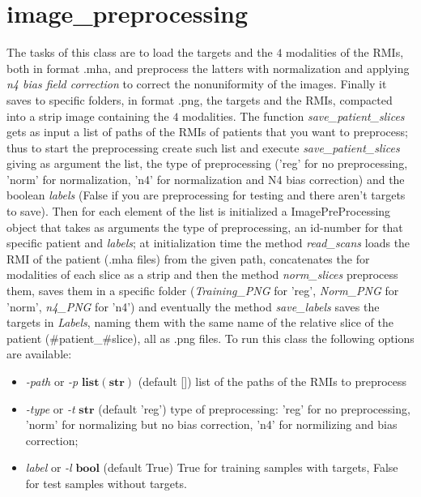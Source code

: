 \documentclass[openany,12pt,english]{book}
\begin{document}
	\section{image\_preprocessing}
	The tasks of this class are to load the targets and the $4$ modalities of the RMIs, both in format .mha, and preprocess the latters with normalization and applying \emph{n4 bias field correction} to correct the nonuniformity of the images. Finally it saves to specific folders, in format .png, the targets and the RMIs, compacted into a strip image containing the $4$ modalities.
	The function \emph{save\_patient\_slices} gets as input a list of paths of the RMIs of patients that you want to preprocess; thus to start the preprocessing create such list and execute \emph{save\_patient\_slices} giving as argument the list, the type of preprocessing ('reg' for no preprocessing, 'norm' for normalization, 'n4' for normalization and N4 bias correction) and the boolean \emph{labels} (False if you are preprocessing for testing and there aren't targets to save). Then for each element of the list is initialized a ImagePreProcessing object that takes as arguments the type of preprocessing, an id-number for that specific patient and \emph{labels}; at initialization time the method \emph{read\_scans} loads the RMI of the patient (.mha files) from the given path, concatenates the for modalities of each slice as a strip and then the method \emph{norm\_slices} preprocess them, saves them in a specific folder (\emph{Training\_PNG} for 'reg', \emph{Norm\_PNG} for 'norm', \emph{n4\_PNG} for 'n4') and eventually  the method \emph{save\_labels} saves the targets in \emph{Labels}, naming them with the same name of the relative slice of the patient (\#patient\_\#slice), all as .png files.
	To run this class the following options are available:
	\begin{itemize}
		\item \emph{-path} or \emph{-p} $\mathbf{list(str)}$ (default []) list of the paths of the RMIs to preprocess
		\item \emph{-type} or \emph{-t} $\mathbf{str}$ (default 'reg') type of preprocessing: 'reg' for no preprocessing, 'norm' for normalizing but no bias correction, 'n4' for normilizing and bias correction;
		\item \emph{label} or \emph{-l} $\mathbf{bool}$ (default True) True for training samples with targets, False for test samples without targets.
	\end{itemize}
	
\end{document}

